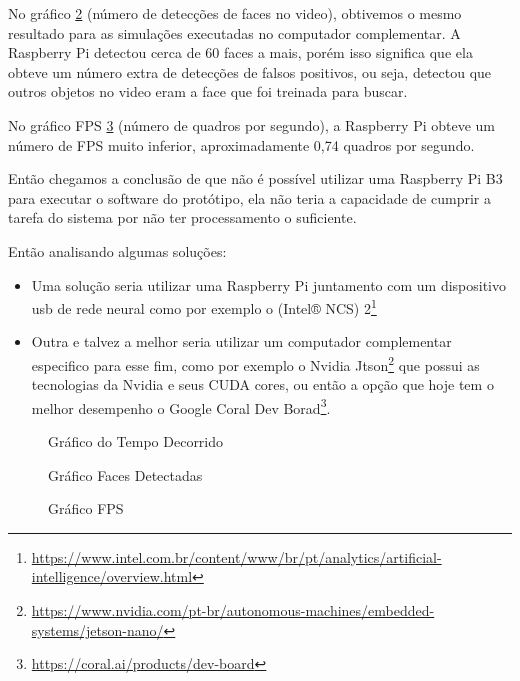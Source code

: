 No gráfico \ref{fig:fd} (número de detecções de faces no video), obtivemos o mesmo resultado para as simulações executadas no computador complementar. A Raspberry Pi detectou cerca de 60 faces a mais, porém isso significa que ela obteve um número extra de detecções de falsos positivos, ou seja, detectou que outros objetos no video eram a face que foi treinada para buscar. 

No gráfico FPS \ref{fig:fps} (número de quadros por segundo), a Raspberry Pi obteve um número de FPS muito inferior, aproximadamente 0,74 quadros por segundo.

Então chegamos a conclusão de que não é possível utilizar uma Raspberry Pi B3 para executar o software do protótipo, ela não teria a capacidade de cumprir a tarefa do sistema por não ter processamento o suficiente. 

Então analisando algumas soluções:

\begin{itemize}
	\item Uma solução seria utilizar uma Raspberry Pi juntamento com um dispositivo usb de rede neural como por exemplo o (Intel® NCS) 2\footnote{\url{https://www.intel.com.br/content/www/br/pt/analytics/artificial-intelligence/overview.html}} 
	\item Outra e talvez a melhor seria utilizar um computador complementar especifico para esse fim, como por exemplo o Nvidia Jtson\footnote{\url{https://www.nvidia.com/pt-br/autonomous-machines/embedded-systems/jetson-nano/}} que possui as tecnologias da Nvidia e seus CUDA cores, ou então a opção que hoje tem o melhor desempenho o Google Coral Dev Borad\footnote{\url{https://coral.ai/products/dev-board}}.
\end{itemize}  

\begin{figure}[H]
	\centering	
	\caption{Gráfico do Tempo Decorrido}
	\fontsize{8pt}{12pt}\selectfont
	\def\svgwidth{15cm}
	
	\label{fig:td}
\end{figure}

\begin{figure}[H]
	\centering	
	\caption{Gráfico Faces Detectadas}
	\fontsize{8pt}{12pt}\selectfont
	\def\svgwidth{15cm}
	
	\label{fig:fd}
\end{figure}

\begin{figure}[H]
	\centering	
	\caption{Gráfico FPS}
	\fontsize{8pt}{12pt}\selectfont
	\def\svgwidth{15cm}
	
	\label{fig:fps}
\end{figure}

